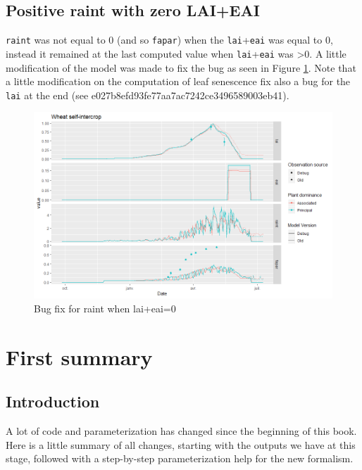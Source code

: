 \documentclass[]{book}
\begin{document}
\hypertarget{positive-raint-with-zero-laieai}{%
\section{Positive raint with zero LAI+EAI}\label{positive-raint-with-zero-laieai}}

\texttt{raint} was not equal to 0 (and so \texttt{fapar}) when the \texttt{lai}+\texttt{eai} was equal to 0, instead it remained at the last computed value when \texttt{lai}+\texttt{eai} was \textgreater{}0. A little modification of the model was made to fix the bug as seen in Figure \ref{fig:bugraint}. Note that a little modification on the computation of leaf senescence fix also a bug for the \texttt{lai} at the end (see e027b8efd93fe77aa7ac7242ce3496589003eb41).

\begin{figure}
\centering
\includegraphics{img/raintbug.png}
\caption{\label{fig:bugraint}Bug fix for raint when lai+eai=0}
\end{figure}

\hypertarget{summary1}{%
\chapter{First summary}\label{summary1}}

\hypertarget{introduction-11}{%
\section{Introduction}\label{introduction-11}}

A lot of code and parameterization has changed since the beginning of this book. Here is a little summary of all changes, starting with the outputs we have at this stage, followed with a step-by-step parameterization help for the new formalism.
\end{document}
